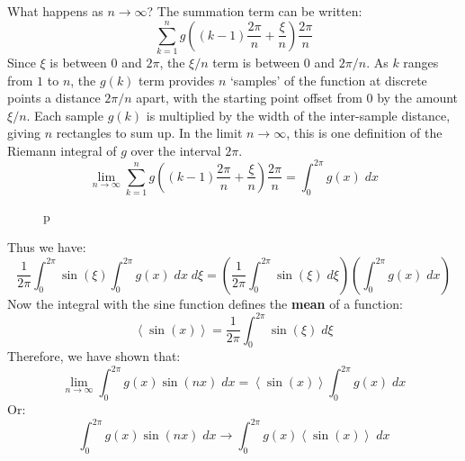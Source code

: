 \documentclass[12pt, a4paper, twoside, openright]{book}
\begin{document}
What happens as $n \to \infty$?  The summation term can be written:
\begin{equation}
\sum_{k=1}^n g\left((k-1)\frac{ 2\pi}{n} + \frac{\xi}{n} \right) \frac{2\pi}{n}
 \end{equation}
Since $\xi$ is between $0$ and $2\pi$, the $\xi/n$ term is between $0$ and $2\pi/n$.
As $k$ ranges from $1$ to $n$, the $g(k)$ term provides $n$ `samples' of the function at discrete points a distance $2\pi/n$ apart, with the starting point offset from $0$ by the amount $\xi/n$.  Each sample $g(k)$ is multiplied by the width of the inter-sample distance, giving $n$ rectangles to sum up.   In the limit $n \to \infty$, this is one definition of the Riemann integral of $g$ over the interval $2\pi$.
\begin{equation}
\lim_{n \to \infty} \sum_{k=1}^n g\left((k-1)\frac{ 2\pi}{n} + \frac{\xi}{n} \right) \frac{2\pi}{n} = \int_0^{2\pi} g(x) \;dx
 \end{equation}

\begin{figure}[ht]
\centering
{}
\caption{p}\label{p}
\end{figure}


Thus we have:
\begin{equation}
\frac{1}{2\pi} \int_0^{2\pi} \sin(\xi)
\int_0^{2\pi} g(x) \;dx \;d\xi
= 
\left( \frac{1}{2\pi} \int_0^{2\pi} \sin(\xi) \;d\xi \right)
\left( \int_0^{2\pi} g(x) \;dx \right)
 \end{equation}
Now the integral with the sine function defines the \textbf{mean} of a function:
\begin{equation}
\left< \sin(x) \right> = \frac{1}{2\pi} \int_0^{2\pi} \sin(\xi) \;d\xi
\end{equation}
Therefore, we have shown that:
\begin{equation}
\lim_{n \to \infty} \int_0^{2\pi} g(x) \sin(nx) \;dx = \left< \sin(x) \right>
 \int_0^{2\pi} g(x) \;dx
\end{equation}
Or:
\begin{equation}
\int_0^{2\pi} g(x) \sin(nx) \;dx  \to  
 \int_0^{2\pi} g(x) \left< \sin(x) \right> \;dx
\end{equation}
\end{document}
